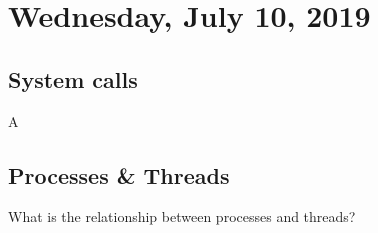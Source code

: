 \section{Wednesday, July 10, 2019}


\subsection{System calls}
A   


\subsection{Processes & Threads}

What is the relationship between processes and threads? 